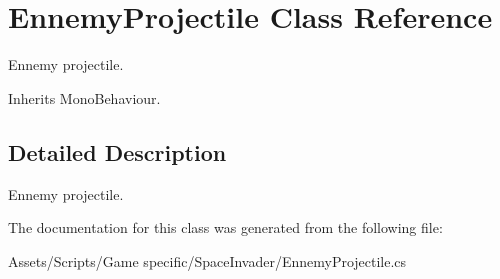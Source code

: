 \hypertarget{class_ennemy_projectile}{\section{Ennemy\-Projectile Class Reference}
\label{class_ennemy_projectile}
}


Ennemy projectile. 




Inherits Mono\-Behaviour.



\subsection{Detailed Description}
Ennemy projectile.



The documentation for this class was generated from the following file\-:\begin{DoxyCompactItemize}
\item 
Assets/\-Scripts/\-Game specific/\-Space\-Invader/Ennemy\-Projectile.\-cs\end{DoxyCompactItemize}
